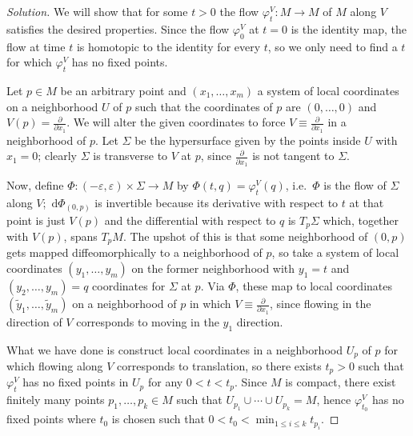 \documentclass[10pt]{article}
\newcommand{\dd}{\,\mathrm{d}}
\providecommand{\eps}{\varepsilon}
\newenvironment{soln}{\begin{proof}[Solution]}{\end{proof}}
\providecommand{\tanvec}[1]{\frac{\partial}{\partial #1}}
\begin{document}
\begin{soln}
    We will show that for some $t>0$
    the flow $\varphi_t^V\colon M\to M$ of $M$ along $V$
    satisfies the desired properties.
    Since the flow $\varphi_0^V$ at $t=0$ is the identity map,
    the flow at time $t$ is homotopic to the identity for every $t$,
    so we only need to find a $t$ for which
    $\varphi_t^V$ has no fixed points.

    Let $p\in M$ be an arbitrary point
    and $(x_1,\dots,x_m)$ a system of local coordinates
    on a neighborhood $U$ of $p$ such that
    the coordinates of $p$ are $(0,\dots,0)$ and $V(p) = \tanvec{x_1}$.
    We will alter the given coordinates to force
    $V\equiv\tanvec{x_1}$ in a neighborhood of $p$.
    Let $\Sigma$ be the hypersurface given by the points inside $U$
    with $x_1 = 0$; clearly $\Sigma$ is transverse to $V$ at $p$,
    since $\tanvec{x_1}$ is not tangent to $\Sigma$.

    Now, define $\Phi\colon(-\eps,\eps)\times\Sigma\to M$
    by $\Phi(t,q) = \varphi_t^V(q)$, i.e.\ $\Phi$ is
    the flow of $\Sigma$ along $V$;
    $\dd\Phi_{(0,p)}$ is invertible because
    its derivative with respect to $t$ at that point is just $V(p)$
    and the differential with respect to $q$ is $T_p\Sigma$
    which, together with $V(p)$, spans $T_pM$.
    The upshot of this is that some neighborhood of $(0,p)$
    gets mapped diffeomorphically to a neighborhood of $p$, so
    take a system of local coordinates $(y_1,\dots,y_m)$
    on the former neighborhood with $y_1 = t$
    and $(y_2,\dots,y_m)=q$ coordinates for $\Sigma$ at $p$.
    Via $\Phi$, these map to local coordinates $(\tilde y_1,\dots,\tilde y_m)$
    on a neighborhood of $p$ in which $V\equiv\tanvec{x_1}$,
    since flowing in the direction of $V$ corresponds to
    moving in the $y_1$ direction.
    
    What we have done is construct local coordinates in
    a neighborhood $U_p$ of $p$
    for which flowing along $V$ corresponds to translation,
    so there exists $t_p > 0$ such that
    $\varphi_t^V$ has no fixed points in $U_p$ for any $0 < t < t_p$.
    Since $M$ is compact, there exist finitely many points
    $p_1,\dots,p_k\in M$ such that $U_{p_1}\cup\cdots\cup U_{p_k} = M$,
    hence $\varphi_{t_0}^V$ has no fixed points
    where $t_0$ is chosen such that $0 < t_0 < \min_{1\le i\le k}t_{p_i}$.
\end{soln}
\end{document}
